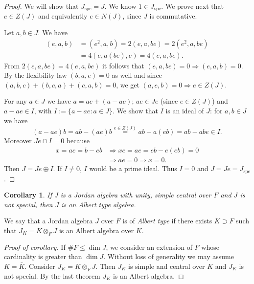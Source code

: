\documentclass{article}
\newtheorem{corollary}[theorem]{Corollary}
\begin{document}
\begin{proof}
We will show that $J_{\text{spe}} = J$. We know $1 \in J_{\text{spe}}$. We prove next that $e \in Z(J)$ and equivalently $e \in N(J)$, since $J$ is commutative.

Let $a, b \in J$. We have
\begin{align*}
(e, a, b) &= (e^2, a, b) = 2(e, a, b e) = 2(e^2, a, b e) \\
&= 4(e, a(b e), e) = 4(e, a, b e).
\end{align*}
From $2(e, a, b e)=4(e, a, b e)$ it follows that $(e, a, b e)=0 \Rightarrow (e, a, b)=0$. By the flexibility law $(b, a, e)=0$ as well and since $(a, b, c)+(b, c, a)+(c, a, b)=0$, we get $(a, e, b)=0 \Rightarrow e \in Z(J)$.

For any $a \in J$ we have $a = a e + (a - a e)$; $a e \in J e$ (since $e \in Z(J)$) and $a - a e \in I$, with $I:=\{a - a e : a \in J\}$. We show that $I$ is an ideal of $J$: for $a, b \in J$ we have
\[
(a - a e) b = a b - (a e) b \stackrel{e \in Z(J)}{=} a b - a(e b) = a b - a b e \in I.
\]
Moreover $J e \cap I = 0$ because
\begin{align*}
x = a e = b - e b &\Rightarrow x e = a e = e b - e(e b) = 0 \\
&\Rightarrow a e = 0 \Rightarrow x = 0.
\end{align*}
Then $J = J e \oplus I$. If $I \neq 0$, $I$ would be a prime ideal. Thus $I=0$ and $J = J e = J_{\text{spe}}$.
\end{proof}

\begin{corollary}
If $J$ is a Jordan algebra with unity, simple central over $F$ and $J$ is not special, then $J$ is an Albert type algebra.
\end{corollary}

\begin{definition}
We say that a Jordan algebra $J$ over $F$ is of \emph{Albert type} if there exists $K \supset F$ such that $J_K = K \otimes_F J$ is an Albert algebra over $K$.
\end{definition}

\begin{proof}[Proof of corollary]
If $\#F \leq \dim J$, we consider an extension of $F$ whose cardinality is greater than $\dim J$. Without loss of generality we may assume $K=\bar{K}$. Consider $J_K = K \otimes_F J$. Then $J_K$ is simple and central over $K$ and $J_K$ is not special. By the last theorem $J_K$ is an Albert algebra.
\end{proof}
\end{document}
